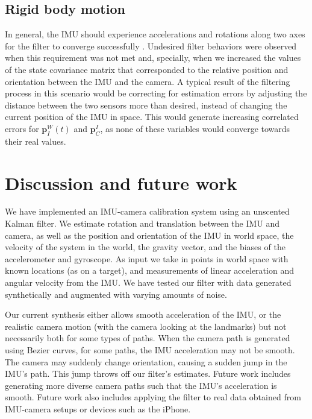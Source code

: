 \documentclass[letterpaper]{article}
\newcommand{\bb}[1]{\mathbf{#1}}
\begin{document}
\subsection{Rigid body motion}

In general, the IMU should experience accelerations and rotations
along two axes for the filter to converge successfully
\cite{2011:kelly:article}. Undesired filter behaviors were observed
when this requirement was not met and, specially, when we increased
the values of the state covariance matrix that corresponded to the
relative position and orientation between the IMU and the camera. 
A typical result of the filtering process in this scenario would be
correcting for estimation errors by adjusting the distance between the
two sensors more than desired, instead of changing the current
position of the IMU in space. This would generate increasing
correlated errors for $\bb{p}_I^W(t)$ and $\bb{p}_C^I$, as none of
these variables would converge towards their real values.


\section{Discussion and future work}
We have implemented an IMU-camera calibration system using an unscented Kalman filter. We estimate rotation and translation between the IMU and camera, as well as the position and orientation of the IMU in world space, the velocity of the system in the world, the gravity vector, and the biases of the accelerometer and gyroscope. As input we take in points in world space with known locations (as on a target), and measurements of linear acceleration and angular velocity from the IMU. We have tested our filter with data generated synthetically and augmented with varying amounts of noise. 

Our current synthesis either allows smooth acceleration of the IMU, or the realistic camera motion (with the camera looking at the landmarks) but not necessarily both for some types of paths. When the camera path is generated using Bezier curves, for some paths, the IMU acceleration may not be smooth. The camera may suddenly change orientation, causing a sudden jump in the IMU's path. This jump throws off our filter's estimates. Future work includes generating more diverse camera paths such that the IMU's acceleration is smooth. Future work also includes applying the filter to real data obtained from IMU-camera setups or devices such as the iPhone. 



\end{document}
